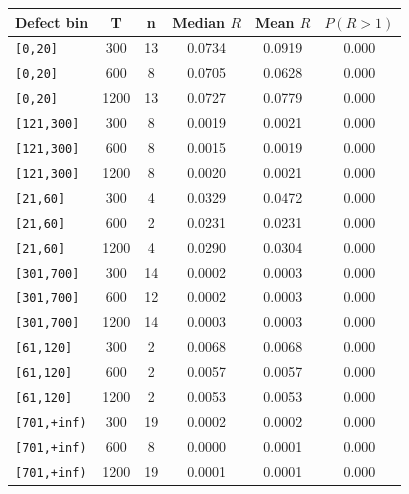 \begin{tabular}{lccccc}
\toprule
Defect bin & T & n & Median $R$ & Mean $R$ & $P(R>1)$ \\
\midrule
\texttt{[0,20]} & 300 & 13 & 0.0734 & 0.0919 & 0.000 \\
\texttt{[0,20]} & 600 & 8 & 0.0705 & 0.0628 & 0.000 \\
\texttt{[0,20]} & 1200 & 13 & 0.0727 & 0.0779 & 0.000 \\
\texttt{[121,300]} & 300 & 8 & 0.0019 & 0.0021 & 0.000 \\
\texttt{[121,300]} & 600 & 8 & 0.0015 & 0.0019 & 0.000 \\
\texttt{[121,300]} & 1200 & 8 & 0.0020 & 0.0021 & 0.000 \\
\texttt{[21,60]} & 300 & 4 & 0.0329 & 0.0472 & 0.000 \\
\texttt{[21,60]} & 600 & 2 & 0.0231 & 0.0231 & 0.000 \\
\texttt{[21,60]} & 1200 & 4 & 0.0290 & 0.0304 & 0.000 \\
\texttt{[301,700]} & 300 & 14 & 0.0002 & 0.0003 & 0.000 \\
\texttt{[301,700]} & 600 & 12 & 0.0002 & 0.0003 & 0.000 \\
\texttt{[301,700]} & 1200 & 14 & 0.0003 & 0.0003 & 0.000 \\
\texttt{[61,120]} & 300 & 2 & 0.0068 & 0.0068 & 0.000 \\
\texttt{[61,120]} & 600 & 2 & 0.0057 & 0.0057 & 0.000 \\
\texttt{[61,120]} & 1200 & 2 & 0.0053 & 0.0053 & 0.000 \\
\texttt{[701,+inf)} & 300 & 19 & 0.0002 & 0.0002 & 0.000 \\
\texttt{[701,+inf)} & 600 & 8 & 0.0000 & 0.0001 & 0.000 \\
\texttt{[701,+inf)} & 1200 & 19 & 0.0001 & 0.0001 & 0.000 \\
\bottomrule
\end{tabular}
